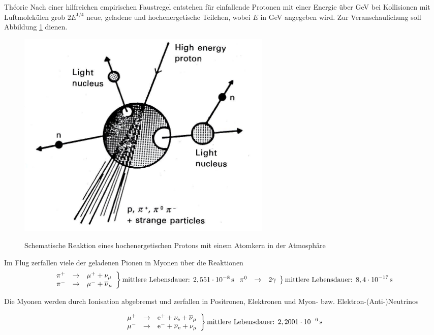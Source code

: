 \documentclass[a4paper,11pt,liststotocnumbered,bibtotocnumbered]{scrartcl}
\begin{document}
\begin{section}{Théorie}
   Nach einer hilfreichen empirischen Faustregel entstehen für einfallende Protonen mit einer Energie über \unit[1]{GeV} bei Kollisionen mit Luftmolekülen grob $2E^{1/4}$ neue, geladene und hochenergetische Teilchen, wobei $E$ in \unit{GeV} angegeben wird. Zur Veranschaulichung soll Abbildung  \ref{fig:preaktion} dienen.
   \begin{figure}[htb]
    \center
    \includegraphics[width=0.6\textwidth]{bilder/03.jpg}
    \caption{Schematische Reaktion eines hochenergetischen Protons mit einem Atomkern in der Atmosphäre}
    \cite[S.~133]{longair}
    \label{fig:preaktion}
   \end{figure}

   Im Flug zerfallen viele der geladenen Pionen in Myonen über die Reaktionen
   \begin{equation*}
	\left.
	\begin{array}[]{lll}
		\pi^{+} & \rightarrow & \mu^{+} + \nu_{\mu}\\
		\pi^{-} & \rightarrow & \mu^{-} + \overline{\nu}_{\mu}\\	
	\end{array}
	\right\} \idx{mittlere Lebensdauer: } \unit[2,551\cdot10^{-8}]{s}
	\left.
	\begin{array}[]{lll}
	\pi^{0} & \rightarrow & 2\gamma	
	\end{array}
	\right\} \idx{mittlere Lebensdauer: } \unit[8,4\cdot10^{-17}]{s}
	\end{equation*}

   Die Myonen werden durch Ionisation abgebremst und zerfallen in Positronen, Elektronen und Myon- bzw. Elektron-(Anti-)Neutrinos

  \begin{equation*}
	\left.
	\begin{array}[]{lll}
		\mu^{+} & \rightarrow & \text{e}^{+} + \nu_{\text{e}} + \overline{\nu}_{\mu}\\
		\mu^{-} & \rightarrow & \text{e}^{-} + \overline{\nu}_{\text{e}} + \nu_{\mu}
	\end{array}
	\right\} \text{mittlere Lebensdauer: } \unit[2,2001\cdot10^{-6}]{s}
   \end{equation*}


\end{section}
\end{document}
